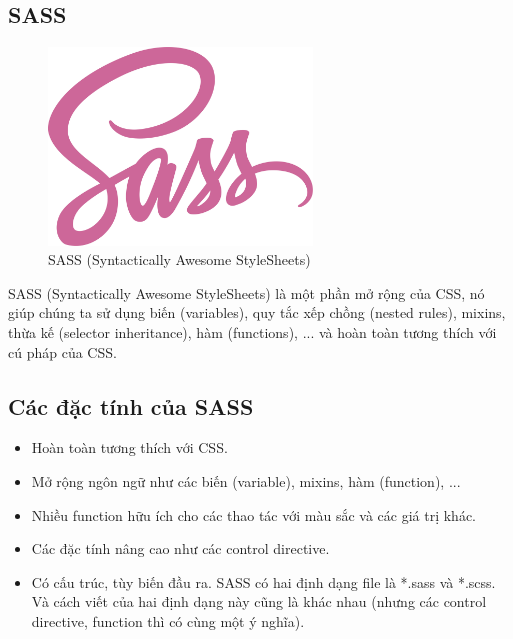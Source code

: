 \subsection{SASS}
    \begin{figure}[H]
        \centering
        \includegraphics[width = 7cm]{image/sass-logo.png}
        \caption{SASS (Syntactically Awesome StyleSheets)}
        \label{fig:sass_logo}
    \end{figure}
    SASS (Syntactically Awesome StyleSheets) là một phần mở rộng của CSS, nó giúp chúng ta sử dụng biến (variables), quy tắc xếp chồng (nested rules), mixins, thừa kế (selector inheritance), hàm (functions), ... và hoàn toàn tương thích với cú pháp của CSS.
    
\subsection{Các đặc tính của SASS}
    \begin{itemize}
        \item Hoàn toàn tương thích với CSS.
        \item Mở rộng ngôn ngữ như các biến (variable), mixins, hàm (function), ...
        \item Nhiều function hữu ích cho các thao tác với màu sắc và các giá trị khác.
        \item Các đặc tính nâng cao như các control directive.
        \item Có cấu trúc, tùy biến đầu ra. SASS có hai định dạng file là *.sass và *.scss. Và cách viết của hai định dạng này cũng là khác nhau (nhưng các control directive, function thì có cùng một ý nghĩa).
    \end{itemize}
